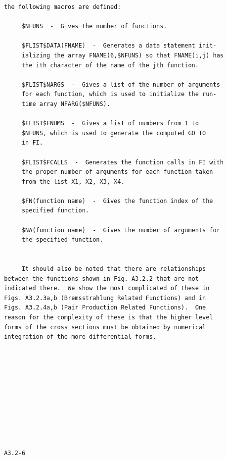 \newpage {} \begin{verbatim}
 the following macros are defined:

      $NFUNS  -  Gives the number of functions.

      $FLIST$DATA(FNAME)  -  Generates a data statement init-
      ializing the array FNAME(6,$NFUNS) so that FNAME(i,j) has
      the ith character of the name of the jth function.

      $FLIST$NARGS  -  Gives a list of the number of arguments
      for each function, which is used to initialize the run-
      time array NFARG($NFUNS).

      $FLIST$FNUMS  -  Gives a list of numbers from 1 to
      $NFUNS, which is used to generate the computed GO TO
      in FI.

      $FLIST$FCALLS  -  Generates the function calls in FI with
      the proper number of arguments for each function taken
      from the list X1, X2, X3, X4.

      $FN(function name)  -  Gives the function index of the
      specified function.

      $NA(function name)  -  Gives the number of arguments for
      the specified function.


      It should also be noted that there are relationships
 between the functions shown in Fig. A3.2.2 that are not
 indicated there.  We show the most complicated of these in
 Figs. A3.2.3a,b (Bremsstrahlung Related Functions) and in
 Figs. A3.2.4a,b (Pair Production Related Functions).  One
 reason for the complexity of these is that the higher level
 forms of the cross sections must be obtained by numerical
 integration of the more differential forms.











 A3.2-6
\end{verbatim}
\newpage {}

